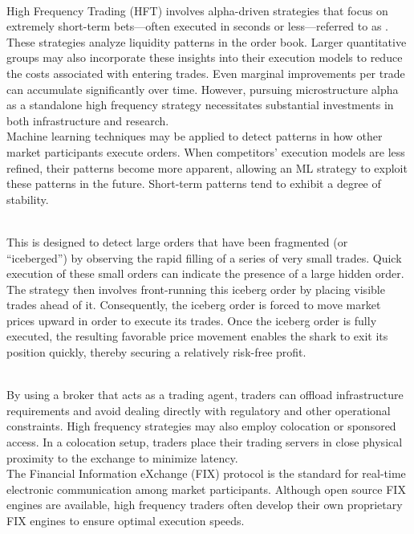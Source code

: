 \begin{definition} \\
High Frequency Trading (HFT) involves alpha-driven strategies that focus on extremely short-term bets—often executed in seconds or less—referred to as . These strategies analyze liquidity patterns in the order book. Larger quantitative groups may also incorporate these insights into their execution models to reduce the costs associated with entering trades. Even marginal improvements per trade can accumulate significantly over time. However, pursuing microstructure alpha as a standalone high frequency strategy necessitates substantial investments in both infrastructure and research.\\
Machine learning techniques may be applied to detect patterns in how other market participants execute orders. When competitors’ execution models are less refined, their patterns become more apparent, allowing an ML strategy to exploit these patterns in the future. Short-term patterns tend to exhibit a degree of stability.
\end{definition}

\begin{definition} \\
This is designed to detect large orders that have been fragmented (or “iceberged”) by observing the rapid filling of a series of very small trades. Quick execution of these small orders can indicate the presence of a large hidden order. The strategy then involves front-running this iceberg order by placing visible trades ahead of it. Consequently, the iceberg order is forced to move market prices upward in order to execute its trades. Once the iceberg order is fully executed, the resulting favorable price movement enables the shark to exit its position quickly, thereby securing a relatively risk-free profit.
\end{definition}

\begin{remark} \\
By using a broker that acts as a trading agent, traders can offload infrastructure requirements and avoid dealing directly with regulatory and other operational constraints.
High frequency strategies may also employ colocation or sponsored access. In a colocation setup, traders place their trading servers in close physical proximity to the exchange to minimize latency.\\
The Financial Information eXchange (FIX) protocol is the standard for real-time electronic communication among market participants. Although open source FIX engines are available, high frequency traders often develop their own proprietary FIX engines to ensure optimal execution speeds.
\end{remark}


